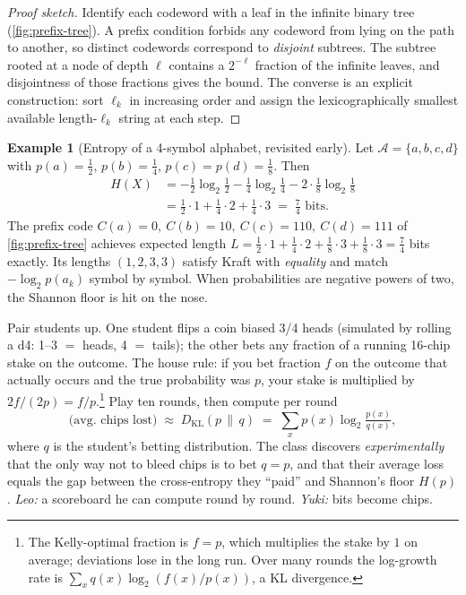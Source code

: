 \documentclass[12pt,a4paper]{article}
\theoremstyle{plain}
\theoremstyle{definition}
\newtheorem{example}[theorem]{Example}
\begin{document}
\begin{proof}[Proof sketch]
Identify each codeword with a leaf in the infinite binary tree
(\cref{fig:prefix-tree}). A prefix condition forbids any codeword
from lying on the path to another, so distinct codewords correspond
to \emph{disjoint} subtrees. The subtree rooted at a node of depth
$\ell$ contains a $2^{-\ell}$ fraction of the infinite leaves, and
disjointness of those fractions gives the bound. The converse is an
explicit construction: sort $\ell_k$ in increasing order and assign
the lexicographically smallest available length-$\ell_k$ string at
each step.
\end{proof}

\begin{example}[Entropy of a 4-symbol alphabet, revisited early]
\label{ex:h4}
Let $\mathcal{A} = \{a, b, c, d\}$ with $p(a) = \tfrac{1}{2}$,
$p(b) = \tfrac{1}{4}$, $p(c) = p(d) = \tfrac{1}{8}$. Then
\begin{align*}
  H(X) &= -\tfrac{1}{2}\log_2\tfrac{1}{2}
         - \tfrac{1}{4}\log_2\tfrac{1}{4}
         - 2\cdot\tfrac{1}{8}\log_2\tfrac{1}{8} \\
       &= \tfrac{1}{2}\cdot 1 + \tfrac{1}{4}\cdot 2 + \tfrac{1}{4}\cdot 3
        \;=\; \tfrac{7}{4} \text{ bits}.
\end{align*}
The prefix code $C(a) = 0,\ C(b) = 10,\ C(c) = 110,\ C(d) = 111$ of
\cref{fig:prefix-tree} achieves expected length
$L = \tfrac12\cdot 1 + \tfrac14\cdot 2 + \tfrac18\cdot 3 + \tfrac18\cdot 3
= \tfrac74$ bits exactly. Its lengths $(1,2,3,3)$ satisfy Kraft with
\emph{equality} and match $-\log_2 p(a_k)$ symbol by symbol. When
probabilities are negative powers of two, the Shannon floor is hit on
the nose.
\end{example}

\begin{activity}[title={Guess-the-next-flip bet game --- 10 minutes}]
\label{act:bet}
Pair students up. One student flips a coin biased 3/4 heads
(simulated by rolling a d4: 1--3 $=$ heads, 4 $=$ tails); the other
bets any fraction of a running 16-chip stake on the outcome. The
house rule: if you bet fraction $f$ on the outcome that actually
occurs and the true probability was $p$, your stake is multiplied by
$2f/(2p) = f/p$.\footnote{The Kelly-optimal fraction is $f=p$, which
multiplies the stake by $1$ on average; deviations lose in the long
run. Over many rounds the log-growth rate is
$\sum_x q(x)\log_2(f(x)/p(x))$, a KL divergence.}
Play ten rounds, then compute per round
\[
  \text{(avg. chips lost)} \;\approx\; D_{\mathrm{KL}}(p \,\|\, q)
  \;=\; \sum_x p(x)\log_2\tfrac{p(x)}{q(x)},
\]
where $q$ is the student's betting distribution. The class discovers
\emph{experimentally} that the only way not to bleed chips is to bet
$q = p$, and that their average loss equals the gap between the
cross-entropy they ``paid'' and Shannon's floor $H(p)$.
\textit{Leo:} a scoreboard he can compute round by round.
\textit{Yuki:} bits become chips.
\end{activity}
\end{document}
